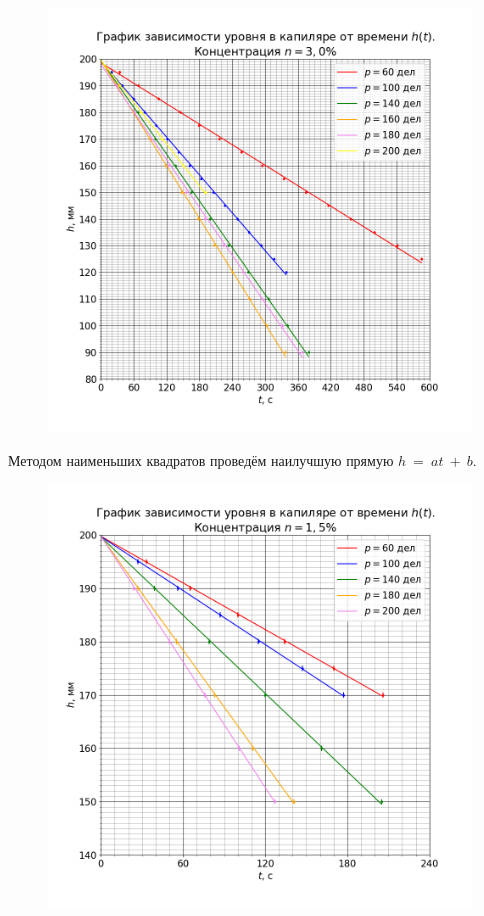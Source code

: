 
\begin{figure}[H]
	\centering
	\includegraphics[width=1 \textwidth]{../plots/graph_h_t_0.png}
\end{figure}

Методом наименьших квадратов проведём наилучшую прямую $h~=~at~+~b$.



\begin{figure}[H]
	\centering
	\includegraphics[width=1 \textwidth]{../plots/graph_h_t_1.png}
\end{figure}

